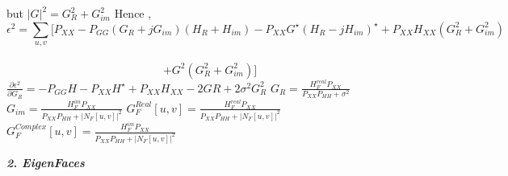 \documentclass[a4paper,12pt]{article}
\begin{document}
\newline but $|G|^{2}=G_{R}^{2}+G_{im}^{2}$
\newline Hence , $$\epsilon^{2}=\sum_{u,v}[P_{XX}-P_{GG}(G_{R}+jG_{im})(H_{R}+H_{im})-P_{XX}G^{\star}(H_{R}-jH_{im})^{\star}+P_{XX}H_{XX}(G_{R}^{2}+G_{im}^{2})$$ \\ 
\newline $$+G^{2}(G_{R}^{2}+G_{im}^{2})]$$
\newline $\frac{\partial \epsilon^{2}}{\partial G_{R}}=-P_{GG}H-P_{XX}H^{\star}+P_{XX}H_{XX}-2GR+2\sigma^{2}G_{R}^{2}$
\newline $G_{R}=\frac{H_{F}^{real}P_{XX}}{P_{XX}P_{HH}+\sigma^{2}}$
\newline $G_{im}=\frac{H_{F}^{im}P_{XX}}{P_{XX}P_{HH}+|N_{F}[u,v]|^{2}}$
\newline$G_{F}^{Real}[u,v]=\frac{H_{F}^{real}P_{XX}}{P_{XX}P_{HH}+|N_{F}[u,v]|^{2}}$
\newline$G_{F}^{Complex}[u,v]=\frac{H_{F}^{im}P_{XX}}{P_{XX}P_{HH}+|N_{F}[u,v]|^{2}}$


\newline \emph{\textbf{2. EigenFaces}}
\end{document}
